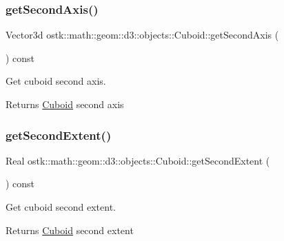 \subsubsection{\texorpdfstring{get\+Second\+Axis()}{getSecondAxis()}}
{\footnotesize\ttfamily Vector3d ostk\+::math\+::geom\+::d3\+::objects\+::\+Cuboid\+::get\+Second\+Axis (\begin{DoxyParamCaption}{ }\end{DoxyParamCaption}) const}



Get cuboid second axis. 

\begin{DoxyReturn}{Returns}
\hyperlink{classostk_1_1math_1_1geom_1_1d3_1_1objects_1_1_cuboid}{Cuboid} second axis 
\end{DoxyReturn}
\mbox{\label{classostk_1_1math_1_1geom_1_1d3_1_1objects_1_1_cuboid_a21bec63f825795671eeb56e084731453}} 
\subsubsection{\texorpdfstring{get\+Second\+Extent()}{getSecondExtent()}}
{\footnotesize\ttfamily Real ostk\+::math\+::geom\+::d3\+::objects\+::\+Cuboid\+::get\+Second\+Extent (\begin{DoxyParamCaption}{ }\end{DoxyParamCaption}) const}



Get cuboid second extent. 

\begin{DoxyReturn}{Returns}
\hyperlink{classostk_1_1math_1_1geom_1_1d3_1_1objects_1_1_cuboid}{Cuboid} second extent 
\end{DoxyReturn}
\mbox{\label{classostk_1_1math_1_1geom_1_1d3_1_1objects_1_1_cuboid_ac60a1fcb4c3472283629b9cf9de45d12}} 
